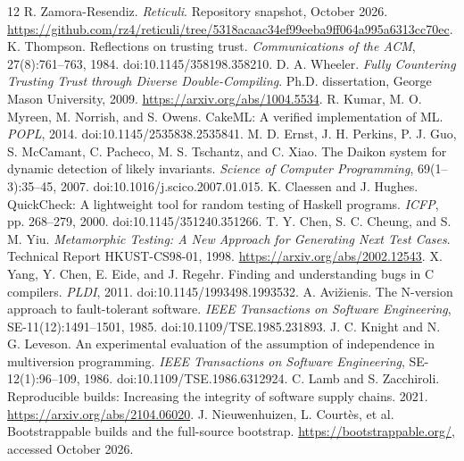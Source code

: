 \documentclass[10pt,twocolumn,letterpaper]{article}
\begin{document}
\begin{thebibliography}{12}\small
{} R. Zamora-Resendiz. \emph{Reticuli}. Repository snapshot, October 2026. \url{https://github.com/rz4/reticuli/tree/5318acaac34ef99eeba9ff064a995a6313cc70ec}.
 K. Thompson. Reflections on trusting trust. \emph{Communications of the ACM}, 27(8):761--763, 1984. doi:10.1145/358198.358210.
 D. A. Wheeler. \emph{Fully Countering Trusting Trust through Diverse Double-Compiling}. Ph.D. dissertation, George Mason University, 2009. \url{https://arxiv.org/abs/1004.5534}.
 R. Kumar, M. O. Myreen, M. Norrish, and S. Owens. CakeML: A verified implementation of ML. \emph{POPL}, 2014. doi:10.1145/2535838.2535841.
 M. D. Ernst, J. H. Perkins, P. J. Guo, S. McCamant, C. Pacheco, M. S. Tschantz, and C. Xiao. The Daikon system for dynamic detection of likely invariants. \emph{Science of Computer Programming}, 69(1--3):35--45, 2007. doi:10.1016/j.scico.2007.01.015.
 K. Claessen and J. Hughes. QuickCheck: A lightweight tool for random testing of Haskell programs. \emph{ICFP}, pp. 268--279, 2000. doi:10.1145/351240.351266.
 T. Y. Chen, S. C. Cheung, and S. M. Yiu. \emph{Metamorphic Testing: A New Approach for Generating Next Test Cases}. Technical Report HKUST-CS98-01, 1998. \url{https://arxiv.org/abs/2002.12543}.
 X. Yang, Y. Chen, E. Eide, and J. Regehr. Finding and understanding bugs in C compilers. \emph{PLDI}, 2011. doi:10.1145/1993498.1993532.
 A. Avi\v{z}ienis. The N-version approach to fault-tolerant software. \emph{IEEE Transactions on Software Engineering}, SE-11(12):1491--1501, 1985. doi:10.1109/TSE.1985.231893.
 J. C. Knight and N. G. Leveson. An experimental evaluation of the assumption of independence in multiversion programming. \emph{IEEE Transactions on Software Engineering}, SE-12(1):96--109, 1986. doi:10.1109/TSE.1986.6312924.
 C. Lamb and S. Zacchiroli. Reproducible builds: Increasing the integrity of software supply chains. 2021. \url{https://arxiv.org/abs/2104.06020}.
 J. Nieuwenhuizen, L. Courtès, et al. Bootstrappable builds and the full-source bootstrap. \url{https://bootstrappable.org/}, accessed October 2026.
\end{thebibliography}
\end{document}
